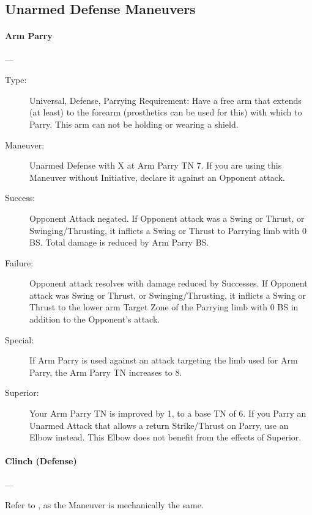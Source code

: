 \documentclass[oneside,11pt,english]{book}
\begin{document}
\subsection{Unarmed Defense Maneuvers}
\paragraph{\large\label{man:Arm Parry}Arm Parry}---\quad{\large[X]}
\vspace{-10pt}\begin{description} 
\item [Type:] Universal, Defense, Parrying 
  Requirement: Have a free arm that extends (at least) to the forearm (prosthetics can be used for this) with 
  which to Parry. This arm can not be holding or wearing a shield. 
\item [Maneuver:] Unarmed Defense with X at Arm Parry TN 7. If you are using this Maneuver without 
  Initiative, declare it against an Opponent attack. 
\item [Success:] Opponent Attack negated. If Opponent attack was a Swing or Thrust, or Swinging/Thrusting, it 
  inflicts a Swing or Thrust to Parrying limb with 0 BS. Total damage is reduced by Arm Parry BS. 
\item [Failure:] Opponent attack resolves with damage reduced by Successes. If Opponent attack was Swing or 
  Thrust, or Swinging/Thrusting, it inflicts a Swing or Thrust to the lower arm Target Zone of the Parrying 
  limb with 0 BS in addition to the Opponent’s attack. 
\item [Special:] If Arm Parry is used against an attack targeting the limb used for Arm Parry, the Arm Parry TN 
  increases to 8. 
\item [Superior:] Your Arm Parry TN is improved by 1, to a base TN of 6. If you Parry an Unarmed Attack that 
  allows a return Strike/Thrust on Parry, use an Elbow instead. This Elbow does not benefit from the effects 
  of Superior. 
\end{description}

\paragraph{\large\label{man:Clinch (Defense)}Clinch (Defense)}---\quad{[X]}

Refer to , as the Maneuver is mechanically the same.
\end{document}
